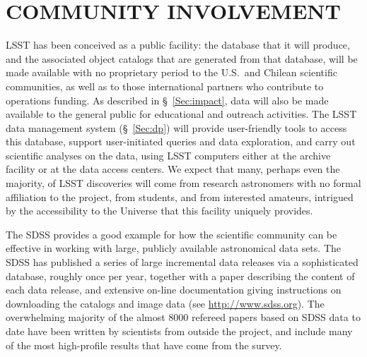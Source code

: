 \section{COMMUNITY INVOLVEMENT}
\label{Sec:community}

LSST has been conceived as a public facility: the database that it will
produce, and the associated object catalogs that are generated from that
database, will be made available with no proprietary period to the
U.S.\ and Chilean scientific communities, as well as to those
international partners who contribute to operations funding.  As
described in \S~\ref{Sec:impact}, data will also be made available to
the general public for educational and outreach activities.
The LSST data management
system (\S~\ref{Sec:dp}) will provide user-friendly tools to access this database, support
user-initiated queries and data exploration, and carry out scientific analyses on the
data, using LSST computers either at the archive facility
or at the data access centers.
We expect that many, perhaps even the majority,
of LSST discoveries will come from research astronomers with no formal
affiliation to the project, from students, and from interested amateurs,
intrigued by the accessibility to the Universe that this facility uniquely
provides.

The SDSS provides a good example for how the scientific
community can be effective in working with large, publicly available
astronomical data sets. The SDSS has published a series of large incremental
data releases via a sophisticated database, roughly once per year, together with
a paper describing the content of each data release, and extensive on-line
documentation giving instructions on downloading the catalogs and image data
(see \url{http://www.sdss.org}). The overwhelming majority of the almost
8000 refereed papers based
on SDSS data to date have been written by scientists from outside
the project, and  include many of the most high-profile results that have come
from the survey.

